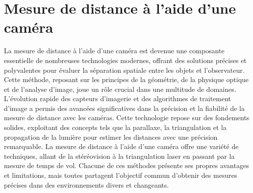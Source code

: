 \newpage
\section{Mesure de distance à l'aide d'une caméra}

La mesure de distance à l'aide d'une caméra est devenue une composante essentielle de nombreuses technologies modernes, offrant des solutions précises et polyvalentes pour évaluer la séparation spatiale entre les objets et l'observateur. Cette méthode, reposant sur les principes de la géométrie, de la physique optique et de l'analyse d'image, joue un rôle crucial dans une multitude de domaines.  
L'évolution rapide des capteurs d'imagerie et des algorithmes de traitement d'image a permis des avancées significatives dans la précision et la fiabilité de la mesure de distance avec les caméras. Cette technologie repose sur des fondements solides, exploitant des concepts tels que la parallaxe, la triangulation et la propagation de la lumière pour estimer les distances avec une précision remarquable.
La mesure de distance à l'aide d'une caméra offre une variété de techniques, allant de la stéréovision à la triangulation laser en passant par la mesure de temps de vol. Chacune de ces méthodes présente ses propres avantages et limitations, mais toutes partagent l'objectif commun d'obtenir des mesures précises dans des environnements divers et changeants.

